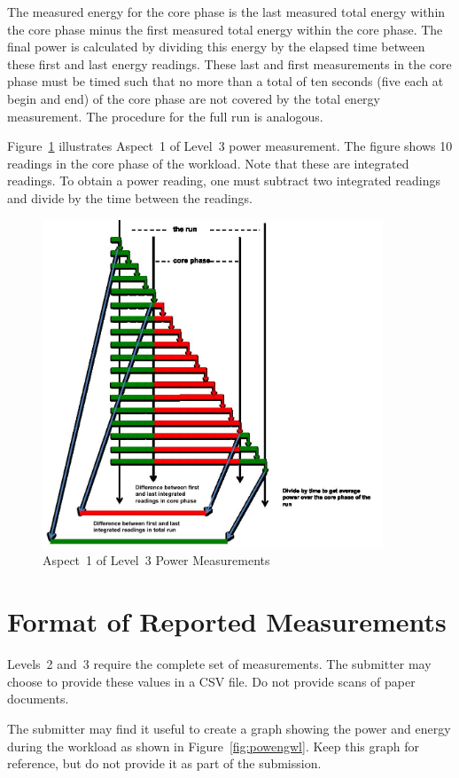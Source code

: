 \noindent
The measured energy for the core phase is the last measured total energy within the core phase minus the first measured total energy within the core phase.
The final power is calculated by dividing this energy by the elapsed time between these first and last energy readings.
These last and first measurements in the core phase must be timed such that no more than a total of ten seconds (five each at begin and end) of the core phase are not covered by the total energy measurement.
The procedure for the full run is analogous.
\wl

\noindent
Figure~\ref{fig:a1l3pm} illustrates Aspect~1 of  Level~3 power measurement.
The figure shows 10 readings in the core phase of the workload.
Note that these are integrated readings.
To obtain a power reading, one must subtract two integrated readings and divide by the time between the readings.

\begin{figure}[t]
\centering
\includegraphics[width=4in]{fig3-5}
\caption{Aspect~1 of Level~3 Power Measurements}
\label{fig:a1l3pm}
\end{figure}

\section{Format of Reported Measurements}
\label{sec:FoRM}
\noindent
Levels~2 and~3 require the complete set of measurements.
The submitter may choose to provide these values in a CSV file.
Do not provide scans of paper documents.
\wl

\noindent
The submitter may find it useful to create a graph showing the power and energy during the workload as shown in Figure~\ref{fig:powengwl}.
Keep this graph for reference, but do not provide it as part of the submission.


